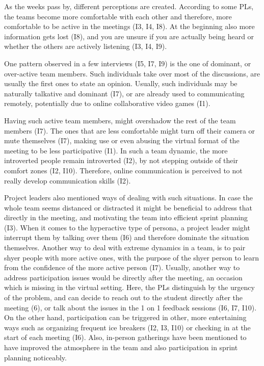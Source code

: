 As the weeks pass by, different perceptions are created. According to some PLs, the teams become more comfortable with each other and therefore, more comfortable to be active in the meetings (I3, I4, I8). At the beginning also more information gets lost (I8), and you are unsure if you are actually being heard or whether the others are actively listening (I3, I4, I9).

One pattern observed in a few interviews (I5, I7, I9) is the one of dominant, or over-active team members. Such individuals take over most of the discussions, are usually the first ones to state an opinion. Usually, such individuals may be naturally talkative and dominant (I7), or are already used to communicating remotely, potentially due to online collaborative video games (I1). 

Having such active team members, might overshadow the rest of the team members (I7). The ones that are less comfortable might turn off their camera or mute themselves (I7), making use or even abusing the virtual format of the meeting to be less participative (I1). In such a team dynamic, the more introverted people remain introverted (I2), by not stepping outside of their comfort zones (I2, I10). Therefore, online communication is perceived to not really develop communication skills (I2).

Project leaders also mentioned ways of dealing with such situations. In case the whole team seems distanced or distracted it might be beneficial to address that directly in the meeting, and motivating the team into efficient sprint planning (I3). When it comes to the hyperactive type of persona, a project leader might interrupt them by talking over them (I6) and therefore dominate the situation themselves. Another way to deal with extreme dynamics in a team, is to pair shyer people with more active ones, with the purpose of the shyer person to learn from the confidence of the more active person (I7). Usually, another way to address participation issues would be directly after the meeting, an occasion which is missing in the virtual setting. Here, the PLs distinguish by the urgency of the problem, and can decide to reach out to the student directly after the meeting (6), or talk about the issues in the 1 on 1 feedback sessions (I6, I7, I10). On the other hand, participation can be triggered in other, more entertaining ways such as organizing frequent ice breakers (I2, I3, I10) or checking in at the start of each meeting (I6). Also, in-person gatherings have been mentioned to have improved the atmosphere in the team and also participation in sprint planning noticeably. 


